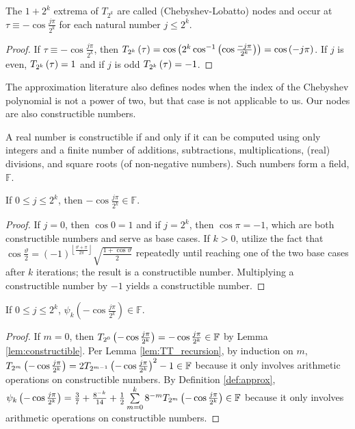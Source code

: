 \begin{lemma}
  \label{lem:nodes}
  The $1 + 2^k$ extrema of $T_{2^k}$ are called (Chebyshev-Lobatto) nodes and occur at $\tau \equiv -\cos\frac{j\pi}{2^k}$ for each natural number $j \leq 2^k$.
\end{lemma}
\begin{proof}
  If $\tau \equiv -\cos\frac{j\pi}{2^k}$, then $T_{2^{k}}\left(\tau\right) = \cos\left(2^k \cos^{-1}\left(\cos \frac{-j\pi}{2^k}\right)\right) = \cos\left(-j\pi\right)$. If $j$ is even, $T_{2^{k}}\left(\tau\right) = 1$ and if $j$ is odd $T_{2^{k}}\left(\tau\right) = -1$.
\end{proof}
The approximation literature also defines nodes when the index of the Chebyshev polynomial is not a power of two, but that case is not applicable to us. Our nodes are also constructible numbers.
\begin{definition}
  \label{def:F}
  A real number is constructible if and only if it can be computed using only integers and a finite number of additions, subtractions, multiplications, (real) divisions, and square roots (of non-negative numbers). Such numbers form a field, $\mathbb{F}$.
\end{definition}
\begin{lemma}
  \label{lem:constructible}
  If $0 \leq j \leq 2^k$, then $-\cos\frac{j\pi}{2^k} \in \mathbb{F}$.
\end{lemma}
\begin{proof}
   If $j = 0$, then $\cos 0 = 1$ and if $j = 2^k$, then $\cos \pi = -1$, which are both constructible numbers and serve as base cases. If $k > 0$, utilize the fact that $\cos\frac{\vartheta}{2} = \left(-1\right)^{\left\lfloor \frac{\vartheta + \pi}{2\pi} \right\rfloor} \sqrt{\frac{1 + \cos \vartheta}{2}}$ repeatedly until reaching one of the two base cases after $k$ iterations; the result is a constructible number. Multiplying a constructible number by $-1$ yields a constructible number.
\end{proof}

\begin{lemma}
  \label{lem:psi_k_constructible}
  If $0 \leq j \leq 2^k$, $\psi_{k}\left(-\cos\frac{j\pi}{2^k}\right) \in \mathbb{F}$.
\end{lemma}
\begin{proof}
   If $m = 0$, then $T_{2^{0}}\left(-\cos\frac{j\pi}{2^k}\right) = -\cos\frac{j\pi}{2^k} \in \mathbb{F}$ by Lemma \ref{lem:constructible}. Per Lemma \ref{lem:TT_recursion}, by induction on $m$, $T_{2^{m}}\left(-\cos\frac{j\pi}{2^k}\right) = 2 T_{2^{m - 1}}\left(-\cos\frac{j\pi}{2^k}\right)^2 - 1 \in \mathbb{F}$ because it only involves arithmetic operations on constructible numbers. By Definition \ref{def:approx}, $\psi_k\left(-\cos\frac{j\pi}{2^k}\right) = \frac{3}{7} + \frac{8^{-k}}{14} + \frac{1}{2} \sum\limits_{m = 0}^{k} 8^{-m} T_{2^{m}}\left(-\cos\frac{j\pi}{2^k}\right) \in \mathbb{F}$ because it only involves arithmetic operations on constructible numbers.
\end{proof}


